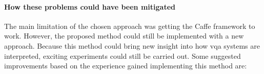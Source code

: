             
            \paragraph{How these problems could have been mitigated\\}

            The main limitation of the chosen approach was getting the Caffe framework to work. However, the proposed method could still be implemented with a new approach. 
            Because this method could bring new insight into how \gls{vqa} systems are interpreted, exciting experiments could still be carried out.
            Some suggested improvements based on the experience gained implementing this method are:

